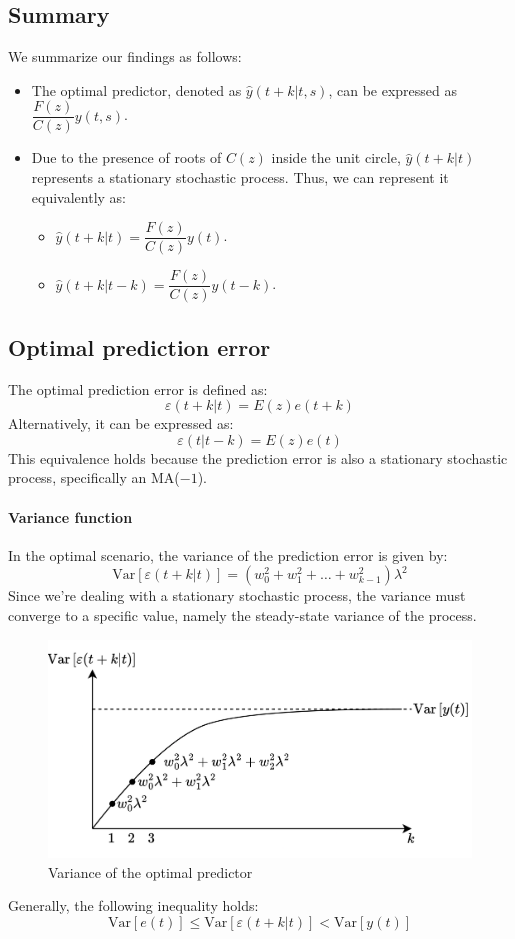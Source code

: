 \subsection{Summary}
We summarize our findings as follows:
\begin{itemize}
    \item The optimal predictor, denoted as $\hat{y}(t+k|t,s)$, can be expressed as $\dfrac{F(z)}{C(z)}y(t,s)$. 
    \item Due to the presence of roots of $C(z)$ inside the unit circle, $\hat{y}(t+k|t)$ represents a stationary stochastic process.
        Thus, we can represent it equivalently as:
        \begin{itemize}
            \item $\hat{y}(t+k|t)=\dfrac{F(z)}{C(z)}y(t)$. 
            \item $\hat{y}(t+k|t-k)=\dfrac{F(z)}{C(z)}y(t-k)$. 
        \end{itemize}
\end{itemize}

\subsection{Optimal prediction error}
The optimal prediction error is defined as:
\[\varepsilon(t+k|t)=E(z)e(t+k)\]
Alternatively, it can be expressed as:
\[\varepsilon(t|t-k)=E(z)e(t)\]
This equivalence holds because the prediction error is also a stationary stochastic process, specifically an MA($-1$).

\paragraph*{Variance function}
In the optimal scenario, the variance of the prediction error is given by:
\[\text{Var}\left[\varepsilon(t+k|t)\right]=\left(w_0^2+w_1^2+\dots+w_{k-1}^2\right)\lambda^2\]
Since we're dealing with a stationary stochastic process, the variance must converge to a specific value, namely the steady-state variance of the process.
\begin{figure}[H]
    \centering
    \includegraphics[width=0.75\linewidth]{images/var.png}
    \caption{Variance of the optimal predictor}
\end{figure}
Generally, the following inequality holds:
\[\text{Var}\left[e(t)\right] \leq \text{Var}\left[\varepsilon(t+k|t)\right] < \text{Var}\left[y(t)\right]\]